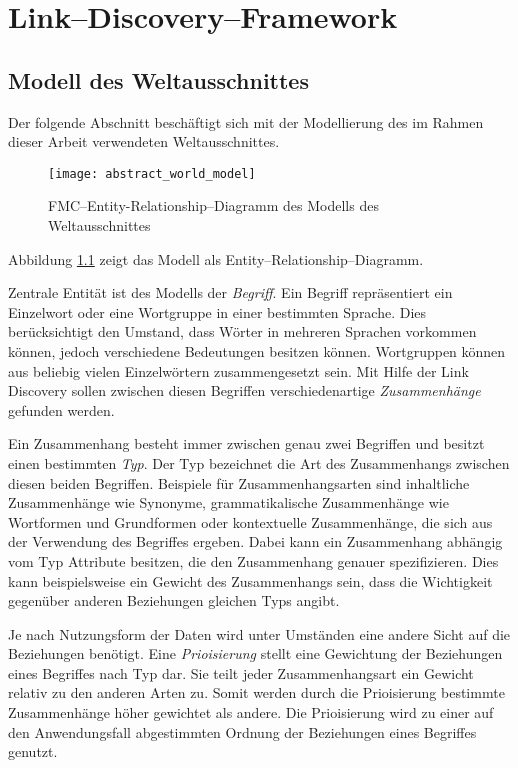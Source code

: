 \chapter{Link--Discovery--Framework}

\section{Modell des Weltausschnittes}
\label{world_model}

Der folgende Abschnitt beschäftigt sich mit der Modellierung des im Rahmen dieser Arbeit verwendeten Weltausschnittes. 

\begin{figure}
\centering
\texttt{[image: abstract\_world\_model]}
\caption{FMC--Entity-Relationship--Diagramm des Modells des Weltausschnittes}
\label{fig:world_model}
\end{figure}

Abbildung \ref{fig:world_model} zeigt das Modell als Entity--Relationship--Diagramm.

Zentrale Entität ist des Modells der \emph{Begriff}. Ein Begriff repräsentiert ein Einzelwort oder eine Wortgruppe in einer bestimmten Sprache. Dies berücksichtigt den Umstand, dass Wörter in mehreren Sprachen vorkommen können, jedoch verschiedene Bedeutungen besitzen können. Wortgruppen können aus beliebig vielen Einzelwörtern zusammengesetzt sein. Mit Hilfe der Link Discovery sollen zwischen diesen Begriffen verschiedenartige \emph{Zusammenhänge} gefunden werden.

Ein Zusammenhang besteht immer zwischen genau zwei Begriffen und besitzt einen bestimmten \emph{Typ}. Der Typ bezeichnet die Art des Zusammenhangs zwischen diesen beiden Begriffen. Beispiele für Zusammenhangsarten sind inhaltliche Zusammenhänge wie Synonyme, grammatikalische Zusammenhänge wie Wortformen und Grundformen oder kontextuelle Zusammenhänge, die sich aus der Verwendung des Begriffes ergeben. Dabei kann ein Zusammenhang abhängig vom Typ Attribute besitzen, die den Zusammenhang genauer spezifizieren. Dies kann beispielsweise ein Gewicht des Zusammenhangs sein, dass die Wichtigkeit gegenüber anderen Beziehungen gleichen Typs angibt.

Je nach Nutzungsform der Daten wird unter Umständen eine andere Sicht auf die Beziehungen benötigt. Eine \emph{Prioisierung} stellt eine Gewichtung der Beziehungen eines Begriffes nach Typ dar. Sie teilt jeder Zusammenhangsart ein Gewicht relativ zu den anderen Arten zu. Somit werden durch die Prioisierung bestimmte Zusammenhänge höher gewichtet als andere. Die Prioisierung wird zu einer auf den Anwendungsfall abgestimmten Ordnung der Beziehungen eines Begriffes genutzt.


